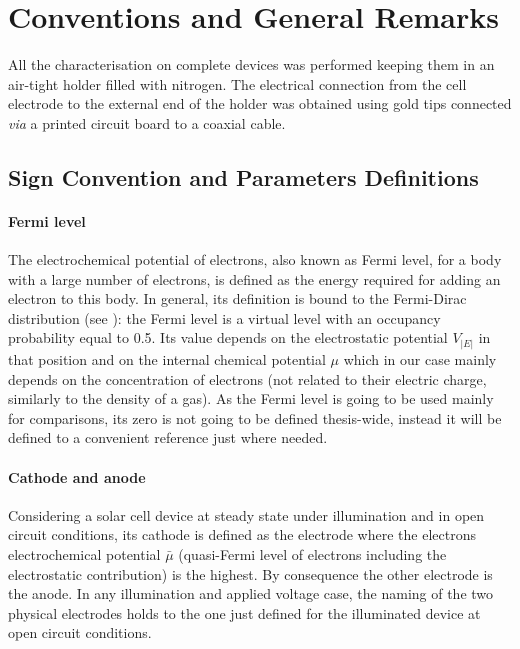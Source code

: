 

\section{Conventions and General Remarks}

	All the characterisation on complete devices was performed keeping them in an air-tight holder filled with nitrogen.
	The electrical connection from the cell electrode to the external end of the holder was obtained using gold tips connected \textsl{via} a printed circuit board to a coaxial cable.

	\subsection{Sign Convention and Parameters Definitions}

		\paragraph{Fermi level}
		The electrochemical potential of electrons, also known as Fermi level, for a body with a large number of electrons, is defined as the energy required for adding an electron to this body.
		In general, its definition is bound to the Fermi\hyp{}Dirac distribution (see ): the Fermi level is a virtual level with an occupancy probability equal to \num{0.5}.
		Its value depends on the electrostatic potential $V_|E|$ in that position and on the internal chemical potential $\mu$ which in our case mainly depends on the concentration of electrons (not related to their electric charge, similarly to the density of a gas).
		As the Fermi level is going to be used mainly for comparisons, its zero is not going to be defined thesis-wide, instead it will be defined to a convenient reference just where needed.

		\paragraph{Cathode and anode}
		Considering a solar cell device at steady state under illumination and in open circuit conditions, its cathode is defined as the electrode where the electrons electrochemical potential $\bar\mu$ (quasi-Fermi level of electrons including the electrostatic contribution) is the highest.
		By consequence the other electrode is the anode.
		In any illumination and applied voltage case, the naming of the two physical electrodes holds to the one just defined for the illuminated device at open circuit conditions.

